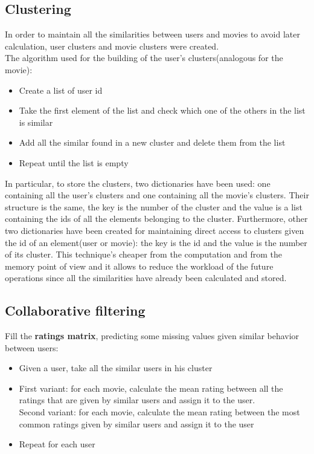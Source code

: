 \documentclass{article}
\begin{document}
\subsection{Clustering}
In order to maintain all the similarities between users and movies to avoid later calculation, user clusters and movie clusters were created.\\
The algorithm used for the building of the user's clusters(analogous for the movie):
\begin{itemize}
    \item Create a list of user id
    \item Take the first element of the list and check which one of the others in the list is similar
    \item Add all the similar found in a new cluster and delete them from the list
    \item Repeat until the list is empty
\end{itemize}
In particular, to store the clusters, two dictionaries have been used: one containing all the user's clusters and one containing all the movie's clusters. Their structure is the same, the key is the number of the cluster and the value is a list containing the ids of all the elements belonging to the cluster. Furthermore, other two dictionaries have been created for maintaining direct access to clusters given the id of an element(user or movie): the key is the id and the value is the number of its cluster. 
\newline
This technique's cheaper from the computation and from the memory point of view and it allows to reduce the workload of the future operations since all the similarities have already been calculated and stored.


\subsection{Collaborative filtering}
Fill the \textbf{ratings matrix}, predicting some missing values given similar behavior between users:
\begin{itemize}
    \item Given a user, take all the similar users in his cluster
    \item First variant: for each movie, calculate the mean rating between all the ratings that are given by similar users and assign it to the user.\\
    Second variant: for each movie, calculate the mean rating between the most common ratings given by similar users and assign it to the user
    \item Repeat for each user
\end{itemize}
\end{document}
